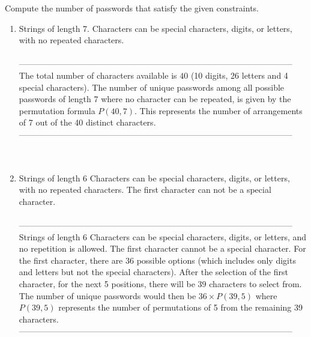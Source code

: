 \documentclass{amsart}
\theoremstyle{definition}
\theoremstyle{Exercise}
\theoremstyle{remark}
\theoremstyle{rule}
\numberwithin{equation}{section}
\begin{document}
Compute the number of passwords that satisfy the given constraints.
    \begin{enumerate}[label=(\roman*)]
    \item Strings of length 7. Characters can be special characters, digits, or letters, with no repeated characters.\\\\
--------------------------------------------------------------------------------------------------\\
The total number of characters available is \(40\) (10 digits, 26 letters and 4 special characters). The number of unique passwords among all possible passwords of length 7 where no character can be repeated, is given by the permutation formula \(P(40, 7)\). This represents the number of arrangements of 7 out of the 40 distinct characters.\\
--------------------------------------------------------------------------------------------------\\
\\\\
    \item Strings of length 6 Characters can be special characters, digits, or letters, with no repeated characters. The first character can not be a special character.\\\\
--------------------------------------------------------------------------------------------------\\
Strings of length 6 Characters can be special characters, digits, or letters, and no repetition is allowed. The first character cannot be a special character. For the first character, there are \(36\) possible options (which includes only digits and letters but not the special characters). After the selection of the first character, for the next 5 positions, there will be \(39\) characters to select from. The number of unique passwords would then be \(36 \times P(39, 5)\) where \(P(39, 5)\) represents the number of permutations of 5 from the remaining 39 characters.\\
--------------------------------------------------------------------------------------------------\\
      \end{enumerate}
 \newpage
\end{document}
